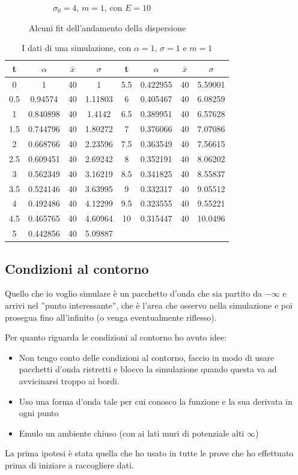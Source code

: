 \begin{figure}[htb]
\begin{subfigure}[b]{0.3\textwidth}
		\caption{$\sigma_0=4$, $m=1$, con $E=10$}
	\end{subfigure}
	\caption{Alcuni fit dell'andamento della dispersione}\label{fig:dispersioneFitE}
\end{figure}

\begin{table}
	\centering
\begin{tabular}{cccc|cccc}
	\toprule
	t	&$\alpha$	&$\bar x$& $\sigma$ &	t	&	$\alpha$	&$\bar x$& $\sigma$\\ \toprule
	0   & 1        & 40 & 1       & 5.5 & 0.422955 & 40 & 5.59001 \\ \midrule
	0.5 & 0.94574  & 40 & 1.11803 & 6   & 0.405467 & 40 & 6.08259 \\ \midrule
	1   & 0.840898 & 40 & 1.4142  & 6.5 & 0.389951 & 40 & 6.57628 \\ \midrule
	1.5 & 0.744796 & 40 & 1.80272 & 7   & 0.376066 & 40 & 7.07086 \\ \midrule
	2   & 0.668766 & 40 & 2.23596 & 7.5 & 0.363549 & 40 & 7.56615 \\ \midrule
	2.5 & 0.609451 & 40 & 2.69242 & 8   & 0.352191 & 40 & 8.06202 \\ \midrule
	3   & 0.562349 & 40 & 3.16219 & 8.5 & 0.341825 & 40 & 8.55837 \\ \midrule
	3.5 & 0.524146 & 40 & 3.63995 & 9   & 0.332317 & 40 & 9.05512 \\ \midrule
	4   & 0.492486 & 40 & 4.12299 & 9.5 & 0.323555 & 40 & 9.55221 \\ \midrule
	4.5 & 0.465765 & 40 & 4.60964 & 10  & 0.315447 & 40 & 10.0496 \\ \midrule
	5   & 0.442856 & 40 & 5.09887 &     &          &    &         \\ \bottomrule
\end{tabular}
\caption{I dati di una simulazione, con $\alpha = 1$, $\sigma=1$ e $m=1$ }\label{table:dispersioneg1}
\end{table}

\subsection{Condizioni al contorno}
Quello che io voglio simulare \`e un pacchetto d'onda che sia partito da $-\infty$ e arrivi nel ''punto interessante'', che \`e l'area che osservo nella simulazione e poi prosegua fino all'infinito (o venga eventualmente riflesso).

Per quanto riguarda le condizioni al contorno ho avuto idee:
\begin{itemize}
	\item Non tengo conto delle condizioni al contorno, faccio in modo di usare pacchetti d'onda ristretti e blocco la simulazione quando questa va ad  avvicinarsi troppo ai bordi.
	\item Uso una forma d'onda tale per cui conosco la funzione e la sua derivata in ogni punto
	\item Emulo un ambiente chiuso (con ai lati muri di potenziale alti $\infty$)
\end{itemize}
La prima ipotesi \`e stata quella che ho usato in tutte le prove che ho effettuato prima di iniziare a raccogliere dati.

